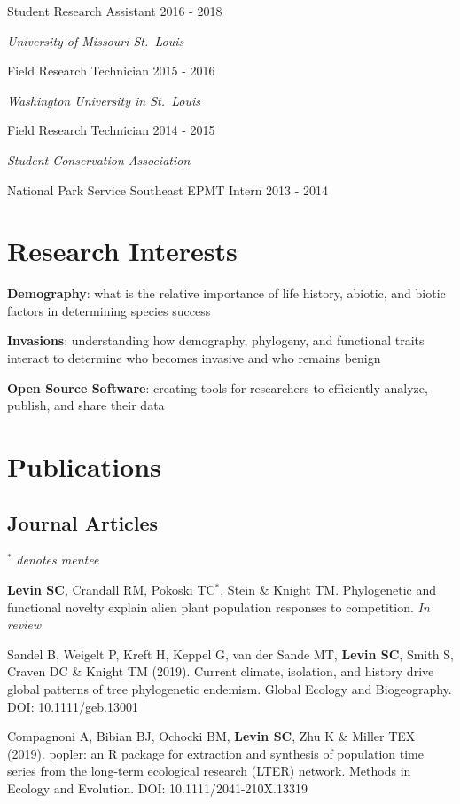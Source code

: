 \documentclass[11pt,]{article}
\begin{document}
Student Research Assistant \hfill 2016 - 2018

\emph{University of Missouri-St.~Louis}

Field Research Technician \hfill 2015 - 2016

\emph{Washington University in St.~Louis}

Field Research Technician \hfill 2014 - 2015

\emph{Student Conservation Association}

National Park Service Southeast EPMT Intern \hfill 2013 - 2014

\hypertarget{research-interests}{%
\section{Research Interests}\label{research-interests}}

\textbf{Demography}: what is the relative importance of life history,
abiotic, and biotic factors in determining species success

\textbf{Invasions}: understanding how demography, phylogeny, and
functional traits interact to determine who becomes invasive and who
remains benign

\textbf{Open Source Software}: creating tools for researchers to
efficiently analyze, publish, and share their data

\hypertarget{publications}{%
\section{Publications}\label{publications}}

\hypertarget{journal-articles}{%
\subsection{Journal Articles}\label{journal-articles}}

\(^\ast\) \emph{denotes mentee}

\textbf{Levin SC}, Crandall RM, Pokoski TC\(^\ast\), Stein \& Knight TM.
Phylogenetic and functional novelty explain alien plant population
responses to competition. \emph{In review}

Sandel B, Weigelt P, Kreft H, Keppel G, van der Sande MT, \textbf{Levin
SC}, Smith S, Craven DC \& Knight TM (2019). Current climate, isolation,
and history drive global patterns of tree phylogenetic endemism. Global
Ecology and Biogeography. DOI: 10.1111/geb.13001

Compagnoni A, Bibian BJ, Ochocki BM, \textbf{Levin SC}, Zhu K \& Miller
TEX (2019). popler: an R package for extraction and synthesis of
population time series from the long-term ecological research (LTER)
network. Methods in Ecology and Evolution. DOI: 10.1111/2041-210X.13319
\end{document}
